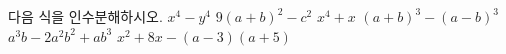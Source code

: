 다음 식을 인수분해하시오.
 $x^4-y^4$
 $9(a+b)^2-c^2$
 $x^4+x$
 $(a+b)^3-(a-b)^3$
 $a^3b-2a^2b^2+ab^3$
 $x^2+8x-(a-3)(a+5)$
